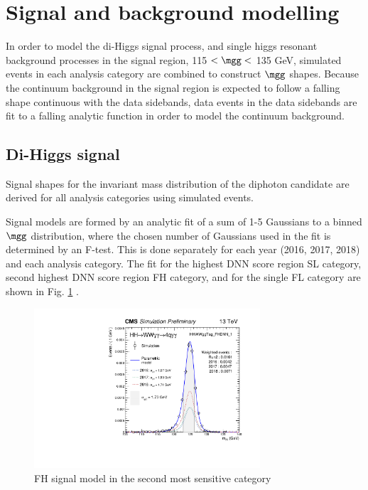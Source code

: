 \section{Signal and background modelling} \label{sec:AnalyticFitting}

In order to model the di-Higgs signal process, and single higgs resonant background processes in the signal region, 115 $< \mgg < $ 135 GeV, simulated events 
in each analysis category are combined to construct $\mgg$ shapes. Because the continuum background in the signal region is expected to follow a falling 
shape continuous with the data sidebands, data events in the data sidebands are fit to a falling analytic function in order to model the continuum background. 

\subsection{Di-Higgs signal}
\label{sec:SignalFitting}

Signal shapes for the invariant mass distribution of the diphoton candidate are derived for all analysis categories using simulated events. 

Signal models are formed by an analytic fit of a sum of 1-5 Gaussians to a binned $\mgg$ distribution, where the chosen number of Gaussians used in the fit is 
determined by an F-test. This is done separately for each year (2016, 2017, 2018) and each analysis category.
The fit for the highest DNN score region SL category, second highest DNN score region FH category, and for the single FL category are shown 
in Fig.  \ref{fig:FHSignalModel} . 



\begin{figure}[!htbp]
  \centering
  \includegraphics[width=0.75\textwidth]{Images/AnalyticFitting/Signal/smodel_HHWWggTag_FHDNN_1.pdf}
  \caption{FH signal model in the second most sensitive category}
\label{fig:FHSignalModel}
\end{figure}

